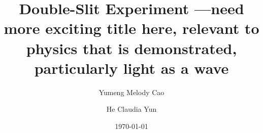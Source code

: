 \documentclass[prb,preprint]{revtex4-1}
\begin{document}
\title{Double-Slit Experiment  ---need more exciting title here, relevant to physics that is demonstrated, particularly light as a wave}

\author{Yumeng Melody Cao}

\author{He Claudia Yun}


\date{\today}

\end{document}
